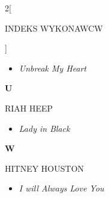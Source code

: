 \documentclass[a4paper]{report}
\begin{document}
\begin{multicols*}{2}[\begin{Huge}INDEKS WYKONAWCW\end{Huge}\vspace{1cm}]
\begin{minipage}{\columnwidth}
\begin{itemize}[topsep=3pt, after=\vspace{3mm}]
		\itemsep0em
		\item[]\textit{Unbreak My Heart}  \\
	\end{itemize}
\end{minipage}
\begin{minipage}{\columnwidth}
	\begin{Large}\textbf{U}\end{Large}RIAH HEEP 
	\begin{itemize}[topsep=3pt, after=\vspace{3mm}]
		\itemsep0em
		\item[]\textit{Lady in Black}  \\
	\end{itemize}
\end{minipage}
\begin{minipage}{\columnwidth}
	\begin{Large}\textbf{W}\end{Large}HITNEY HOUSTON 
	\begin{itemize}[topsep=3pt, after=\vspace{3mm}]
		\itemsep0em
		\item[]\textit{I will Always Love You}  \\
	\end{itemize}
\end{minipage}



\end{multicols*}
\end{document}
